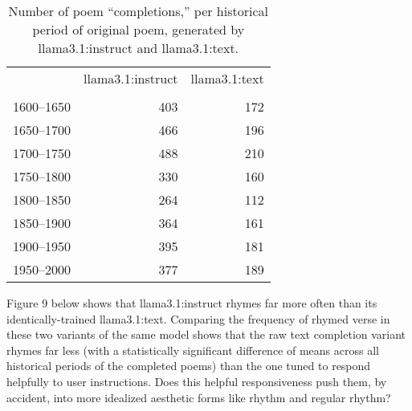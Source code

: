 \documentclass{simple-humanities}         %
\begin{document}
\begin{table}[H]
  \centering
  \small
  \singlespacing
  \begin{tabular}{lrr}
    \toprule
     & llama3.1:instruct & llama3.1:text \\
     &  &  \\
    \midrule
    1600--1650 & 403 & 172 \\
    1650--1700 & 466 & 196 \\
    1700--1750 & 488 & 210 \\
    1750--1800 & 330 & 160 \\
    1800--1850 & 264 & 112 \\
    1850--1900 & 364 & 161 \\
    1900--1950 & 395 & 181 \\
    1950--2000 & 377 & 189 \\
    \bottomrule
    \end{tabular}    
  \caption{Number of poem ``completions,'' per historical period of original poem, generated by llama3.1:instruct and llama3.1:text.}
  \label{tab:num_poems_instruct_text}
  \end{table}

Figure 9 below shows that llama3.1:instruct rhymes far more often than its identically-trained llama3.1:text.
Comparing the frequency of rhymed verse in these two variants of the same model shows that the raw text completion variant rhymes far less (with a statistically significant difference of means across all historical periods of the completed poems) than the one tuned to respond helpfully to user instructions. 
Does this helpful responsiveness push them, by accident, into more idealized aesthetic forms like rhythm and regular rhythm?
\end{document}
